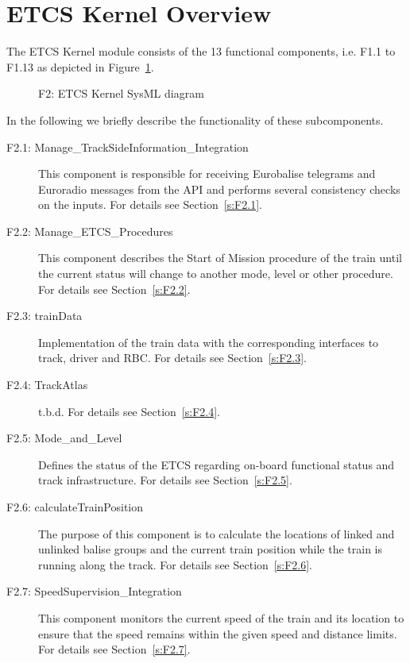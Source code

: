 \section{ETCS Kernel Overview}\label{s:ETCS_Kernel_Overview}

The ETCS Kernel module consists of the 13 functional components, i.e. F1.1 to F1.13 as depicted in Figure~\ref{f:ETCS_Kernel}. 
\begin{figure}
\center
{}
\caption{F2: ETCS Kernel SysML diagram}\label{f:ETCS_Kernel}
\end{figure}
In the following we briefly describe the functionality of these subcomponents.
\begin{description}
\item[F2.1: Manage\_TrackSideInformation\_Integration] This component is responsible for receiving Eurobalise telegrams and Euroradio messages from the API and performs several consistency checks on the inputs. For details see Section~\ref{s:F2.1}.
\item[F2.2: Manage\_ETCS\_Procedures] This component describes the Start of Mission procedure of the train until the current status will change to another mode, level or other procedure. For details see Section~\ref{s:F2.2}.
\item[F2.3: trainData] Implementation of the train data with the corresponding interfaces to track, driver and RBC. For details see Section~\ref{s:F2.3}.
\item[F2.4: TrackAtlas] t.b.d.  For details see Section~\ref{s:F2.4}.
\item[F2.5: Mode\_and\_Level] Defines the status of the ETCS regarding on-board functional status and track infrastructure. For details see Section~\ref{s:F2.5}.
\item[F2.6: calculateTrainPosition] The purpose of this component is to calculate the locations of linked and unlinked balise groups and the current train position while the train is running along the track.  For details see Section~\ref{s:F2.6}.
\item[F2.7: SpeedSupervision\_Integration] This component monitors the current speed of the train and its location to ensure that the speed remains within the given speed and distance limits. For details see Section~\ref{s:F2.7}.

\end{description}
